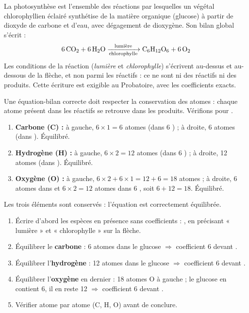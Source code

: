 \documentclass[11pt]{article}
\newcommand{\cle}[1]{{\popxbold\color{popdark}#1}}
\begin{document}
\begin{propriete}
La photosynthèse est l'ensemble des réactions par lesquelles un végétal chlorophyllien éclairé synthétise de la matière organique (glucose) à partir de dioxyde de carbone et d'eau, avec dégagement de dioxygène. Son bilan global s'écrit :
\[ \ce{6CO2 + 6H2O ->[$\text{lumière}$][\text{chlorophylle}] C6H12O6 + 6O2} \]
Les conditions de la réaction (\emph{lumière} et \emph{chlorophylle}) s'écrivent au-dessus et au-dessous de la flèche, et non parmi les réactifs : ce ne sont ni des réactifs ni des produits. Cette écriture est exigible au Probatoire, avec les coefficients exacts.
\end{propriete}

\begin{experience}
Une équation-bilan correcte doit respecter la \cle{conservation des atomes} : chaque atome présent dans les réactifs se retrouve dans les produits. Vérifions pour .
\begin{enumerate}
\item \textbf{Carbone (C) :} à gauche, $6 \times 1 = 6$ atomes (dans 6 ) ; à droite, 6 atomes (dans ). Équilibré.
\item \textbf{Hydrogène (H) :} à gauche, $6 \times 2 = 12$ atomes (dans 6 ) ; à droite, 12 atomes (dans ). Équilibré.
\item \textbf{Oxygène (O) :} à gauche, $6 \times 2 + 6 \times 1 = 12 + 6 = 18$ atomes ; à droite, 6 atomes dans  et $6 \times 2 = 12$ atomes dans 6 , soit $6 + 12 = 18$. Équilibré.
\end{enumerate}
Les trois éléments sont conservés : l'équation est correctement équilibrée.
\end{experience}

\begin{methode}
\begin{enumerate}
\item Écrire d'abord les espèces en présence sans coefficients : , en précisant « lumière » et « chlorophylle » sur la flèche.
\item Équilibrer le \textbf{carbone} : 6 atomes dans le glucose $\Rightarrow$ coefficient 6 devant .
\item Équilibrer l'\textbf{hydrogène} : 12 atomes dans le glucose $\Rightarrow$ coefficient 6 devant .
\item Équilibrer l'\textbf{oxygène} en dernier : 18 atomes O à gauche ; le glucose en contient 6, il en reste 12 $\Rightarrow$ coefficient 6 devant .
\item Vérifier atome par atome (C, H, O) avant de conclure.
\end{enumerate}
\end{methode}
\end{document}
